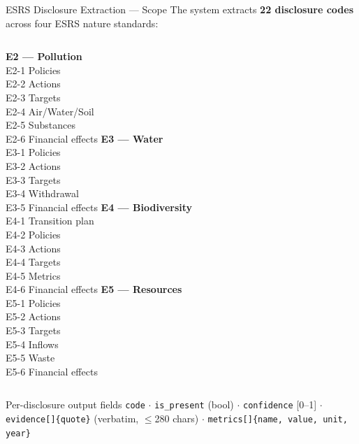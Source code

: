 \documentclass[aspectratio=169]{beamer}
\begin{document}
\begin{frame}{ESRS Disclosure Extraction --- Scope}
  \footnotesize
  The system extracts \textbf{22 disclosure codes} across four ESRS nature standards:

  \vspace{4pt}
  \begin{columns}
      \textcolor{wwfgreen}{\textbf{E2 --- Pollution}}\\[3pt]
      \footnotesize
      E2-1 Policies\\
      E2-2 Actions\\
      E2-3 Targets\\
      E2-4 Air/Water/Soil\\
      E2-5 Substances\\
      E2-6 Financial effects
      \textcolor{wwfgreen}{\textbf{E3 --- Water}}\\[3pt]
      \footnotesize
      E3-1 Policies\\
      E3-2 Actions\\
      E3-3 Targets\\
      E3-4 Withdrawal\\
      E3-5 Financial effects
      \textcolor{wwfgreen}{\textbf{E4 --- Biodiversity}}\\[3pt]
      \footnotesize
      E4-1 Transition plan\\
      E4-2 Policies\\
      E4-3 Actions\\
      E4-4 Targets\\
      E4-5 Metrics\\
      E4-6 Financial effects
      \textcolor{wwfgreen}{\textbf{E5 --- Resources}}\\[3pt]
      \footnotesize
      E5-1 Policies\\
      E5-2 Actions\\
      E5-3 Targets\\
      E5-4 Inflows\\
      E5-5 Waste\\
      E5-6 Financial effects
  \end{columns}

  \vspace{8pt}
  \begin{block}{Per-disclosure output fields}
    \scriptsize
    \texttt{code} $\cdot$ \texttt{is\_present} (bool) $\cdot$ \texttt{confidence} [0--1] $\cdot$
    \texttt{evidence[]\{quote\}} (verbatim, $\leq$280 chars) $\cdot$
    \texttt{metrics[]\{name, value, unit, year\}}
  \end{block}
\end{frame}
\end{document}
